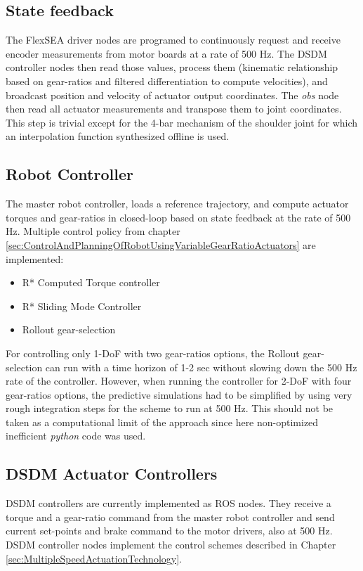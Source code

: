 \subsection{State feedback}

The FlexSEA driver nodes are programed to continuously request and receive encoder measurements from motor boards at a rate of 500 Hz. The DSDM controller nodes then read those values, process them (kinematic relationship based on gear-ratios and filtered differentiation to compute velocities), and broadcast position and velocity of actuator output coordinates. The \textit{obs} node then read all actuator measurements and transpose them to joint coordinates. This step is trivial except for the 4-bar mechanism of the shoulder joint for which an interpolation function synthesized offline is used. 

\subsection{Robot Controller}

The master robot controller, loads a reference trajectory, and compute actuator torques and gear-ratios in closed-loop based on state feedback at the rate of 500 Hz. Multiple control policy from chapter \ref{sec:ControlAndPlanningOfRobotUsingVariableGearRatioActuators} are implemented:
%
\begin{itemize}
	\item R* Computed Torque controller
	\item R* Sliding Mode Controller
	\item Rollout gear-selection
\end{itemize}
%
For controlling only 1-DoF with two gear-ratios options, the Rollout gear-selection can run with a time horizon of 1-2 sec without slowing down the 500 Hz rate of the controller. However, when running the controller for 2-DoF with four gear-ratios options, the predictive simulations had to be simplified by using very rough integration steps for the scheme to run at 500 Hz. This should not be taken as a computational limit of the approach since here non-optimized inefficient \textit{python} code was used.

\subsection{DSDM Actuator Controllers}

DSDM controllers are currently implemented as ROS nodes. They receive a torque and a gear-ratio command from the master robot controller and send current set-points and brake command to the motor drivers, also at 500 Hz. DSDM controller nodes implement the control schemes described in Chapter \ref{sec:MultipleSpeedActuationTechnology}.

